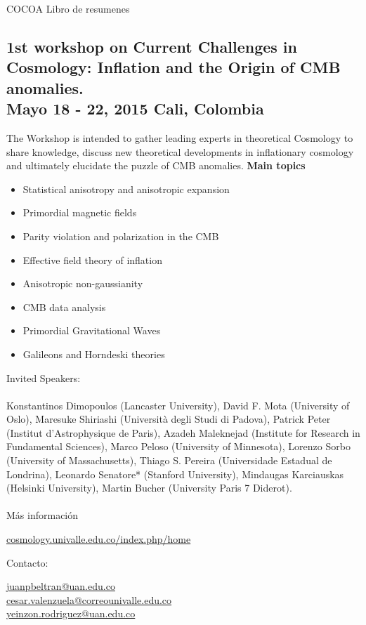 \documentclass{book}
\begin{document}
COCOA Libro de resumenes

\subsection{1st workshop on Current Challenges in Cosmology: Inflation and the Origin of CMB anomalies.\\ Mayo 18 - 22, 2015 Cali, Colombia}
The Workshop is intended to gather leading experts in theoretical Cosmology to share knowledge, discuss new theoretical developments in inflationary cosmology and ultimately elucidate the puzzle of CMB anomalies. 
\textbf{Main topics}
\begin{itemize}
\item Statistical anisotropy and anisotropic expansion
\item Primordial magnetic fields
\item Parity violation and polarization in the CMB
\item Effective field theory of inflation
\item Anisotropic non-gaussianity
\item CMB data analysis
\item Primordial Gravitational  Waves
\item Galileons and Horndeski theories
\end{itemize}
\par
\noindent Invited Speakers:\\
\\
Konstantinos Dimopoulos (Lancaster University),	David F. Mota (University of Oslo), Maresuke Shiriashi (Università degli Studi di Padova), Patrick Peter
(Institut d’Astrophysique de Paris), Azadeh Maleknejad (Institute for Research in Fundamental Sciences), Marco Peloso (University of Minnesota), Lorenzo Sorbo (University of Massachusetts), Thiago S. Pereira (Universidade Estadual de Londrina), Leonardo Senatore* (Stanford University), Mindaugas Karciauskas (Helsinki University), Martin Bucher (University Paris 7 Diderot).\\
\\
Más información

\begin{center}
\url{cosmology.univalle.edu.co/index.php/home}
\end{center}

Contacto:\\
\begin{flushright}
\url{juanpbeltran@uan.edu.co}\\
\url{cesar.valenzuela@correounivalle.edu.co}\\
\url{yeinzon.rodriguez@uan.edu.co}
\end{flushright}
\end{document}
